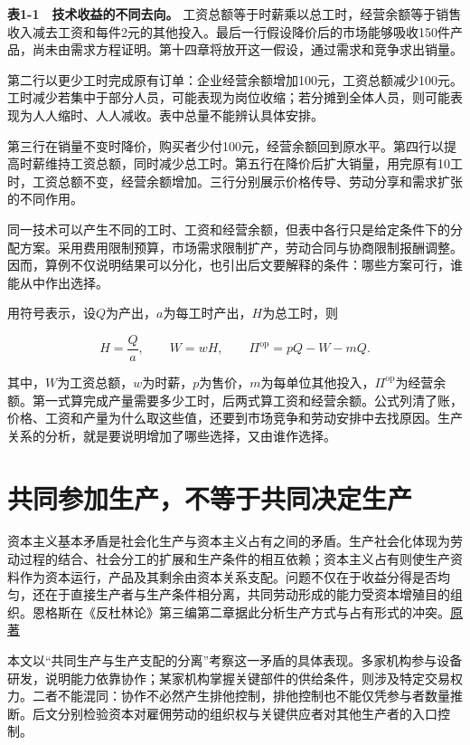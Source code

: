 \documentclass[UTF8,fontset=windows,12pt,a4paper,oneside,openany]{ctexbook}
\begin{document}
\textbf{表1-1　技术收益的不同去向。} 工资总额等于时薪乘以总工时，经营余额等于销售收入减去工资和每件2元的其他投入。最后一行假设降价后的市场能够吸收150件产品，尚未由需求方程证明。第十四章将放开这一假设，通过需求和竞争求出销量。

第二行以更少工时完成原有订单：企业经营余额增加100元，工资总额减少100元。工时减少若集中于部分人员，可能表现为岗位收缩；若分摊到全体人员，则可能表现为人人缩时、人人减收。表中总量不能辨认具体安排。

第三行在销量不变时降价，购买者少付100元，经营余额回到原水平。第四行以提高时薪维持工资总额，同时减少总工时。第五行在降价后扩大销量，用完原有10工时，工资总额不变，经营余额增加。三行分别展示价格传导、劳动分享和需求扩张的不同作用。

同一技术可以产生不同的工时、工资和经营余额，但表中各行只是给定条件下的分配方案。采用费用限制预算，市场需求限制扩产，劳动合同与协商限制报酬调整。因而，算例不仅说明结果可以分化，也引出后文要解释的条件：哪些方案可行，谁能从中作出选择。

用符号表示，设\(Q\)为产出，\(a\)为每工时产出，\(H\)为总工时，则

\[
H=\frac{Q}{a},\qquad
W=wH,\qquad
\Pi^{\mathrm{op}}=pQ-W-mQ.
\tag{1-1}
\]

其中，\(W\)为工资总额，\(w\)为时薪，\(p\)为售价，\(m\)为每单位其他投入，\(\Pi^{\mathrm{op}}\)为经营余额。第一式算完成产量需要多少工时，后两式算工资和经营余额。公式列清了账，价格、工资和产量为什么取这些值，还要到市场竞争和劳动安排中去找原因。生产关系的分析，就是要说明增加了哪些选择，又由谁作选择。

\section{共同参加生产，不等于共同决定生产}

资本主义基本矛盾是社会化生产与资本主义占有之间的矛盾。生产社会化体现为劳动过程的结合、社会分工的扩展和生产条件的相互依赖；资本主义占有则使生产资料作为资本运行，产品及其剩余由资本关系支配。问题不仅在于收益分得是否均匀，还在于直接生产者与生产条件相分离，共同劳动形成的能力受资本增殖目的组织。恩格斯在《反杜林论》第三编第二章据此分析生产方式与占有形式的冲突。\href{https://www.marxists.org/archive/marx/works/1877/anti-duhring/ch24.htm}{原著}

本文以“共同生产与生产支配的分离”考察这一矛盾的具体表现。多家机构参与设备研发，说明能力依靠协作；某家机构掌握关键部件的供给条件，则涉及特定交易权力。二者不能混同：协作不必然产生排他控制，排他控制也不能仅凭参与者数量推断。后文分别检验资本对雇佣劳动的组织权与关键供应者对其他生产者的入口控制。
\end{document}
